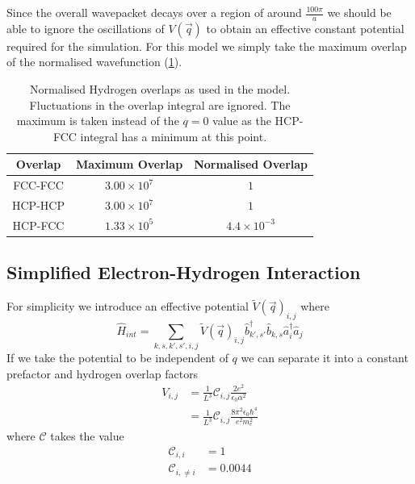 Since the overall wavepacket decays over a region
of around \(\frac{100\pi}{a}\) we should be
able to ignore the oscillations of
\(V(\vec{q})\) to obtain an effective constant
potential required for the simulation. For this
model we simply take the maximum overlap
of the normalised wavefunction (\cref{tab:hydrogen overlaps}).
\begin{table}[htbp]
    \begin{center}
        \begin{tabular}{ *{3}{c} }
            \toprule
            Overlap & Maximum Overlap        & Normalised Overlap     \\
            \midrule
            FCC-FCC & \(3.00\times{}10^{7}\) & \(1\)                  \\
            HCP-HCP & \(3.00\times{}10^{7}\) & \(1\)                  \\
            HCP-FCC & \(1.33\times{}10^{5}\) & \(4.4\times{}10^{-3}\) \\
            \bottomrule
        \end{tabular}
    \end{center}
    \caption{Normalised Hydrogen overlaps as used in the
        model. Fluctuations in the overlap
        integral are ignored. The maximum
        is taken instead of the \(q=0\) value as the HCP-FCC integral
        has a minimum at this point.}\label{tab:hydrogen overlaps}
\end{table}

\subsection{Simplified Electron-Hydrogen Interaction
}\label{sec:simplified interaction}
For simplicity we introduce
an effective potential
\({\tilde{V}(\vec{q})}_{i,j}\) where
\begin{equation}
    \hat{H}_{int} = \sum_{k,s,k',s',i,j}
    {\tilde{V}(\vec{q})}_{i,j}
    \hat{b}^\dagger_{k',s'}\hat{b}_{k,s}
    \hat{a}^\dagger_{i}\hat{a}_{j}
    \label{eqn:interaction hamiltonian in k}
\end{equation}
If we take the potential to be independent
of \(q\) we can separate it
into a constant prefactor
and hydrogen overlap factors
\begin{align}
    V_{i,j}
     & =
    \frac{1}{L^3}
    \mathcal{C}_{i,j}
    \frac{2e^2}{\epsilon_0 \alpha^2} \\
     & =
    \frac{1}{L^3}
    \mathcal{C}_{i,j}
    \frac{8 \pi^2 \epsilon_0 \hbar^4}{e^2 m_e^2}
    \label{eqn:simplified interacton potential}
\end{align}
where \(\mathcal{C}\) takes
the value
\begin{align}
    \mathcal{C}_{i, i}      & = 1      \\
    \mathcal{C}_{i, \neq i} & = 0.0044
\end{align}

